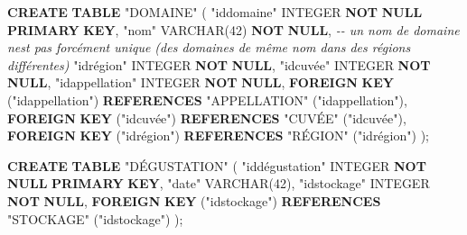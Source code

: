 \documentclass[11pt]{article}
\newenvironment{Shaded}{}{}
\newcommand{\KeywordTok}[1]{\textcolor[rgb]{0.00,0.44,0.13}{\textbf{{#1}}}}
\newcommand{\DataTypeTok}[1]{\textcolor[rgb]{0.56,0.13,0.00}{{#1}}}
\newcommand{\DecValTok}[1]{\textcolor[rgb]{0.25,0.63,0.44}{{#1}}}
\newcommand{\CommentTok}[1]{\textcolor[rgb]{0.38,0.63,0.69}{\textit{{#1}}}}
\newcommand{\OtherTok}[1]{\textcolor[rgb]{0.00,0.44,0.13}{{#1}}}
\newcommand{\NormalTok}[1]{{#1}}
\begin{document}
\begin{Shaded}
\begin{Highlighting}[]
\KeywordTok{CREATE} \KeywordTok{TABLE} \OtherTok{"DOMAINE"}\NormalTok{ (}
   \OtherTok{"iddomaine"} \DataTypeTok{INTEGER} \KeywordTok{NOT} \KeywordTok{NULL} \KeywordTok{PRIMARY} \KeywordTok{KEY}\NormalTok{,}
    \OtherTok{"nom"} \DataTypeTok{VARCHAR}\NormalTok{(}\DecValTok{42}\NormalTok{)  }\KeywordTok{NOT} \KeywordTok{NULL}\NormalTok{,       }\CommentTok{{-}{-} un nom de domaine n\textquotesingle{}est pas forcément unique (des domaines de même nom dans des régions différentes)  }
  \OtherTok{"idrégion"} \DataTypeTok{INTEGER} \KeywordTok{NOT} \KeywordTok{NULL}\NormalTok{,}
  \OtherTok{"idcuvée"} \DataTypeTok{INTEGER} \KeywordTok{NOT} \KeywordTok{NULL}\NormalTok{,}
  \OtherTok{"idappellation"} \DataTypeTok{INTEGER} \KeywordTok{NOT} \KeywordTok{NULL}\NormalTok{,}
  \KeywordTok{FOREIGN} \KeywordTok{KEY}\NormalTok{ (}\OtherTok{"idappellation"}\NormalTok{) }\KeywordTok{REFERENCES} \OtherTok{"APPELLATION"}\NormalTok{ (}\OtherTok{"idappellation"}\NormalTok{),}
  \KeywordTok{FOREIGN} \KeywordTok{KEY}\NormalTok{ (}\OtherTok{"idcuvée"}\NormalTok{) }\KeywordTok{REFERENCES} \OtherTok{"CUVÉE"}\NormalTok{ (}\OtherTok{"idcuvée"}\NormalTok{),}
  \KeywordTok{FOREIGN} \KeywordTok{KEY}\NormalTok{ (}\OtherTok{"idrégion"}\NormalTok{) }\KeywordTok{REFERENCES} \OtherTok{"RÉGION"}\NormalTok{ (}\OtherTok{"idrégion"}\NormalTok{)}
\NormalTok{);}

\KeywordTok{CREATE} \KeywordTok{TABLE} \OtherTok{"DÉGUSTATION"}\NormalTok{ (}
  \OtherTok{"iddégustation"} \DataTypeTok{INTEGER} \KeywordTok{NOT} \KeywordTok{NULL} \KeywordTok{PRIMARY} \KeywordTok{KEY}\NormalTok{,}
  \OtherTok{"date"} \DataTypeTok{VARCHAR}\NormalTok{(}\DecValTok{42}\NormalTok{),}
  \OtherTok{"idstockage"} \DataTypeTok{INTEGER} \KeywordTok{NOT} \KeywordTok{NULL}\NormalTok{,}
  \KeywordTok{FOREIGN} \KeywordTok{KEY}\NormalTok{ (}\OtherTok{"idstockage"}\NormalTok{) }\KeywordTok{REFERENCES} \OtherTok{"STOCKAGE"}\NormalTok{ (}\OtherTok{"idstockage"}\NormalTok{)}
\NormalTok{);}



\end{Highlighting}
\end{Shaded}
\end{document}
